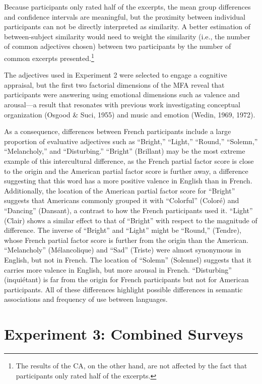 \documentclass[
  english,
  man,floatsintext]{apa6}
\begin{document}
Because participants only rated half of the excerpts, the mean group differences and confidence intervals are meaningful, but the proximity between individual participants can not be directly interpreted as similarity. A better estimation of between-subject similarity would need to weight the similarity (i.e., the number of common adjectives chosen) between two participants by the number of common excerpts presented.\footnote{The results of the CA, on the other hand, are not affected by the fact that participants only rated half of the excerpts.}

The adjectives used in Experiment 2 were selected to engage a cognitive appraisal, but the first two factorial dimensions of the MFA reveal that participants were answering using emotional dimensions such as valence and arousal---a result that resonates with previous work investigating conceptual organization (Osgood \& Suci, 1955) and music and emotion (Wedin, 1969, 1972).

As a consequence, differences between French participants include a large proportion of evaluative adjectives such as ``Bright,'' ``Light,'' ``Round,'' ``Solemn,'' ``Melancholy,'' and ``Disturbing.'' ``Bright'' (Brillant) may be the most extreme example of this intercultural difference, as the French partial factor score is close to the origin and the American partial factor score is further away, a difference suggesting that this word has a more positive valence in English than in French. Additionally, the location of the American partial factor score for ``Bright'' suggests that Americans commonly grouped it with ``Colorful'' (Coloré) and ``Dancing'' (Dansant), a contrast to how the French participants used it. ``Light'' (Clair) shows a similar effect to that of ``Bright'' with respect to the magnitude of difference. The inverse of ``Bright'' and ``Light'' might be ``Round,'' (Tendre), whose French partial factor score is further from the origin than the American. ``Melancholy'' (Mélancolique) and ``Sad'' (Triste) were almost synonymous in English, but not in French. The location of ``Solemn'' (Solennel) suggests that it carries more valence in English, but more arousal in French. ``Disturbing'' (inquiétant) is far from the origin for French participants but not for American participants. All of these differences highlight possible differences in semantic associations and frequency of use between languages.

\hypertarget{experiment-3-combined-surveys}{%
\section{Experiment 3: Combined Surveys}\label{experiment-3-combined-surveys}}
\end{document}
